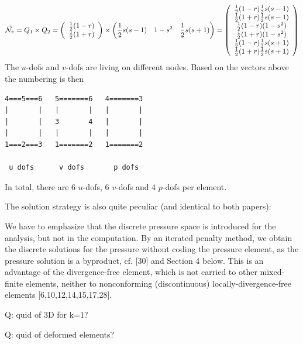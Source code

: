 \[
\vec{{\mathcal{N}}}_v = Q_1 \times Q_2 = 
\left(
\begin{array}{c}
\frac12 (1-r) \\
\frac12(1+r)
\end{array}
\right)
\times
\left(
\frac12 s(s-1)  \quad
1-s^2 \quad
\frac12 s(s+1)
\right)
=
\left(
\begin{array}{c}
\frac12 (1-r) \frac12 s(s-1) \\
\frac12(1+r)  \frac12 s(s-1) \\
\frac12 (1-r) (1-s^2) \\
\frac12(1+r)  (1-s^2) \\
\frac12 (1-r) \frac12 s(s+1)\\
\frac12(1+r)  \frac12 s(s+1)
\end{array}
\right)
\]
The $u$-dofs and $v$-dofs are living on different nodes.
Based on the vectors above the numbering is then 
\begin{verbatim}
4===5===6   5=======6   4=======3
|       |   |       |   |       |
|       |   3       4   |       |
|       |   |       |   |       |
1===2===3   1=======2   1=======2

 u dofs      v dofs       p dofs

\end{verbatim}
In total, there are 6 $u$-dofs, 6 $v$-dofs and 4 $p$-dofs per element.


The solution strategy is also quite peculiar (and identical to both papers):
\begin{displayquote}
{\color{darkgray}
We have to emphasize
that the discrete pressure space is introduced for the analysis, but not in the
computation. By an iterated penalty method, we obtain the discrete solutions
for the pressure without coding the pressure element, as the pressure
solution is a byproduct, cf. [30] and Section 4 below. This is an advantage
of the divergence-free element, which is not carried to other mixed-ﬁnite
elements, neither to nonconforming (discontinuous) locally-divergence-free
elements [6,10,12,14,15,17,28].
}
\end{displayquote}






Q: quid of 3D for k=1? 

Q: quid of deformed elements?
